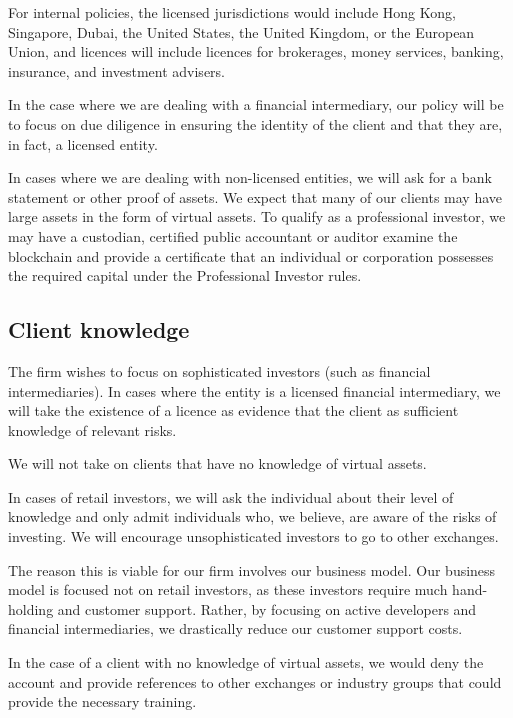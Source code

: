 For internal policies, the licensed jurisdictions would include Hong
Kong, Singapore, Dubai, the United States, the United Kingdom, or the
European Union, and licences will include licences for brokerages,
money services, banking, insurance, and investment advisers.

In the case where we are dealing with a financial intermediary, our
policy will be to focus on due diligence in ensuring the identity of
the client and that they are, in fact, a licensed entity.

In cases where we are dealing with non-licensed entities, we will ask
for a bank statement or other proof of assets.  We expect that many of
our clients may have large assets in the form of virtual assets.  To
qualify as a professional investor, we may have a custodian, certified
public accountant or auditor examine the blockchain and provide a
certificate that an individual or corporation possesses the required
capital under the Professional Investor rules.

\subsection{Client knowledge}

The firm wishes to focus on sophisticated investors (such as financial
intermediaries).  In cases where the entity is a licensed
financial intermediary, we will take the existence of a licence as
evidence that the client as sufficient knowledge of relevant risks.

We will not take on clients that have no knowledge of virtual assets.

In cases of retail investors, we will ask the individual about their
level of knowledge and only admit individuals who, we believe, are
aware of the risks of investing.  We will encourage unsophisticated
investors to go to other exchanges.

The reason this is viable for our firm involves our business model.
Our business model is focused not on retail investors, as these
investors require much hand-holding and customer support.  Rather, by
focusing on active developers and financial intermediaries, we
drastically reduce our customer support costs.

In the case of a client with no knowledge of virtual assets, we would deny
the account and provide references to other exchanges or industry
groups that could provide the necessary training.


